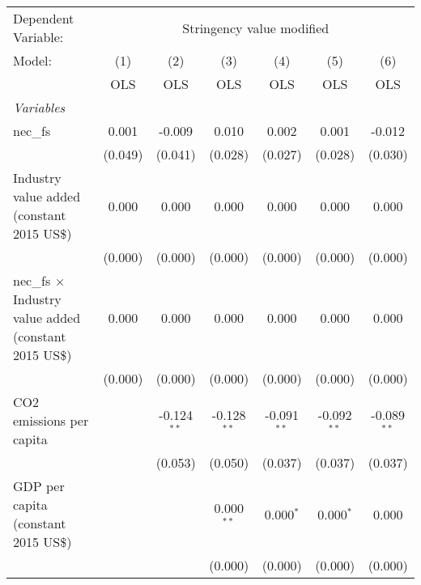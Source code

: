 
\begingroup
\centering
\begin{tabular}{lcccccc}
   \toprule
   Dependent Variable: & \multicolumn{6}{c}{Stringency value modified}\\
   Model:                                                        & (1)     & (2)           & (3)           & (4)            & (5)            & (6)\\  
                                                                 &  OLS    & OLS           & OLS           & OLS            & OLS            & OLS\\  
   \midrule
   \emph{Variables}\\
   nec\_fs                                                       & 0.001   & -0.009        & 0.010         & 0.002          & 0.001          & -0.012\\   
                                                                 & (0.049) & (0.041)       & (0.028)       & (0.027)        & (0.028)        & (0.030)\\   
   Industry value added (constant 2015 US\$)                     & 0.000   & 0.000         & 0.000         & 0.000          & 0.000          & 0.000\\   
                                                                 & (0.000) & (0.000)       & (0.000)       & (0.000)        & (0.000)        & (0.000)\\   
   nec\_fs $\times$ Industry value added (constant 2015 US\$)    & 0.000   & 0.000         & 0.000         & 0.000          & 0.000          & 0.000\\   
                                                                 & (0.000) & (0.000)       & (0.000)       & (0.000)        & (0.000)        & (0.000)\\   
   CO2 emissions per capita                                      &         & -0.124$^{**}$ & -0.128$^{**}$ & -0.091$^{**}$  & -0.092$^{**}$  & -0.089$^{**}$\\   
                                                                 &         & (0.053)       & (0.050)       & (0.037)        & (0.037)        & (0.037)\\   
   GDP per capita (constant 2015 US\$)                           &         &               & 0.000$^{**}$  & 0.000$^{*}$    & 0.000$^{*}$    & 0.000\\   
                                                                 &         &               & (0.000)       & (0.000)        & (0.000)        & (0.000)\\   

\end{tabular}
